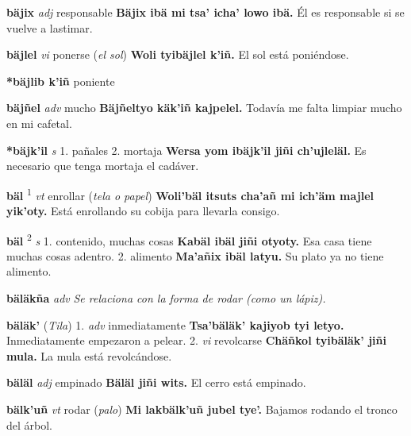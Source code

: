 \documentclass[10pt]{scrbook}
\newcommand{\entry}[1]{\textbf{#1}}
\newcommand{\onedefinition}[1]{#1.}
\newcommand{\defsuperscript}[1]{\textsuperscript{#1}}
\newcommand{\nontranslationdef}[1]{\textit{#1}}
\newcommand{\partofspeech}[1]{\textit{#1}}
\newcommand{\spanishtranslation}[1]{#1}
\newcommand{\clarification}[1]{(\textit{#1})}
\newcommand{\cholexample}[1]{\textbf{#1}}
\newcommand{\exampletranslation}[1]{#1}
\newcommand{\relevantdialect}[1]{(\textit{#1})}
\begin{document}
\begin{multicols}{2}
\entry{bäjix}
\partofspeech{adj}
\spanishtranslation{responsable}
\cholexample{Bäjix ibä mi tsa' icha' lowo ibä.}
\exampletranslation{Él es responsable si se vuelve a lastimar.}

\entry{bäjlel}
\partofspeech{vi}
\spanishtranslation{ponerse}
\clarification{el sol}
\cholexample{Woli tyibäjlel k'iñ.}
\exampletranslation{El sol está poniéndose.}

\entry{*bäjlib k'iñ}
\spanishtranslation{poniente}

\entry{bäjñel}
\partofspeech{adv}
\spanishtranslation{mucho}
\cholexample{Bäjñeltyo käk'iñ kajpelel.}
\exampletranslation{Todavía me falta limpiar mucho en mi cafetal.}

\entry{*bäjk'il}
\partofspeech{s}
\onedefinition{1}
\spanishtranslation{pañales}
\onedefinition{2}
\spanishtranslation{mortaja}
\cholexample{Wersa yom ibäjk'il jiñi ch'ujleläl.}
\exampletranslation{Es necesario que tenga mortaja el cadáver.}

\entry{bäl}
\defsuperscript{1}
\partofspeech{vt}
\spanishtranslation{enrollar}
\clarification{tela o papel}
\cholexample{Woli'bäl itsuts cha'añ mi ich'äm majlel yik'oty.}
\exampletranslation{Está enrollando su cobija para llevarla consigo.}

\entry{bäl}
\defsuperscript{2}
\partofspeech{s}
\onedefinition{1}
\spanishtranslation{contenido, muchas cosas}
\cholexample{Kabäl ibäl jiñi otyoty.}
\exampletranslation{Esa casa tiene muchas cosas adentro.}
\onedefinition{2}
\spanishtranslation{alimento}
\cholexample{Ma'añix ibäl latyu.}
\exampletranslation{Su plato ya no tiene alimento.}

\entry{bäläkña}
\partofspeech{adv}
\nontranslationdef{Se relaciona con la forma de rodar (como un lápiz).}

\entry{bäläk'}
\relevantdialect{Tila}
\onedefinition{1}
\partofspeech{adv}
\spanishtranslation{inmediatamente}
\cholexample{Tsa'bäläk' kajiyob tyi letyo.}
\exampletranslation{Inmediatamente empezaron a pelear.}
\onedefinition{2}
\partofspeech{vi}
\spanishtranslation{revolcarse}
\cholexample{Chäñkol tyibäläk' jiñi mula.}
\exampletranslation{La mula está revolcándose.}

\entry{bäläl}
\partofspeech{adj}
\spanishtranslation{empinado}
\cholexample{Bäläl jiñi wits.}
\exampletranslation{El cerro está empinado.}

\entry{bälk'uñ}
\partofspeech{vt}
\spanishtranslation{rodar}
\clarification{palo}
\cholexample{Mi lakbälk'uñ jubel tye'.}
\exampletranslation{Bajamos rodando el tronco del árbol.}


\end{multicols}
\end{document}
